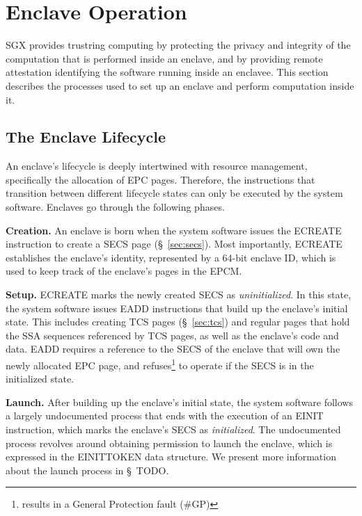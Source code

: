 \section{Enclave Operation}

SGX provides trustring computing by protecting the privacy and integrity of the
computation that is performed inside an enclave, and by providing remote
attestation identifying the software running inside an enclavee. This section
describes the processes used to set up an enclave and perform computation
inside it.


\subsection{The Enclave Lifecycle}
\label{sec:lifecycle}

An enclave's lifecycle is deeply intertwined with resource management,
specifically the allocation of EPC pages. Therefore, the instructions that
transition between different lifecycle states can only be executed by the
system software. Enclaves go through the following phases.


\textbf{Creation.} An enclave is born when the system software issues the
ECREATE instruction to create a SECS page (\S~\ref{sec:secs}). Most
importantly, ECREATE establishes the enclave's identity, represented by a
64-bit enclave ID, which is used to keep track of the enclave's pages in the
EPCM.

\textbf{Setup.} ECREATE marks the newly created SECS as \textit{uninitialized}.
In this state, the system software issues EADD instructions that build up the
enclave's initial state. This includes creating TCS pages (\S~\ref{sec:tcs})
and regular pages that hold the SSA sequences referenced by TCS pages, as well
as the enclave's code and data. EADD requires a reference to the SECS of the
enclave that will own the newly allocated EPC page, and
refuses\footnote{results in a General Protection fault (\#GP)} to operate if
the SECS is in the initialized state.

\textbf{Launch.} After building up the enclave's initial state, the system
software follows a largely undocumented process that ends with the execution of
an EINIT instruction, which marks the enclave's SECS as \textit{initialized}.
The undocumented process revolves around obtaining permission to launch the
enclave, which is expressed in the EINITTOKEN data structure. We present more
information about the launch process in \S~TODO.

